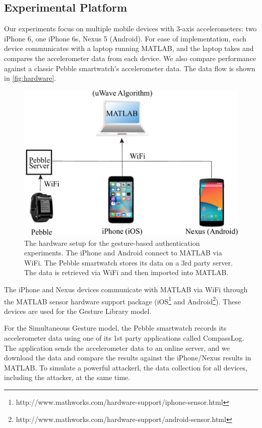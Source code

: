 
\subsection{Experimental Platform}
\label{sec:Platform}

Our experiments focus on multiple mobile devices with 3-axis accelerometers: two iPhone 6, one iPhone 6s, Nexus 5 (Android). For ease of implementation, each device communicates with a laptop running MATLAB, and the laptop takes and compares the accelerometer data from each device. We also compare performance against a classic Pebble smartwatch's accelerometer data. The data flow is shown in \autoref{fig:hardware}.

\begin{figure}[!tb]
\centering
\includegraphics[width=0.9 \linewidth]{./figures/hardware_composition.pdf}
\caption{The hardware setup for the gesture-based authentication experiments. The iPhone and Android connect to MATLAB via WiFi. The Pebble smartwatch stores its data on a 3rd party server. The data is retrieved via WiFi and then imported into MATLAB.}
\label{fig:hardware}
\end{figure}

The iPhone and Nexus devices communicate with MATLAB via WiFi through the MATLAB sensor hardware support package (iOS\footnote{http://www.mathworks.com/hardware-support/iphone-sensor.html} and Android\footnote{http://www.mathworks.com/hardware-support/android-sensor.html}). These devices are used for the Gesture Library model.

For the Simultaneous Gesture model, the Pebble smartwatch records its accelerometer data using one of its 1st party applications called CompassLog. The application sends the accelerometer data to an online server, and we download the data and compare the results against the iPhone/Nexus results in MATLAB. To simulate a powerful attackerl, the data collection for all devices, including the attacker, at the same time.

